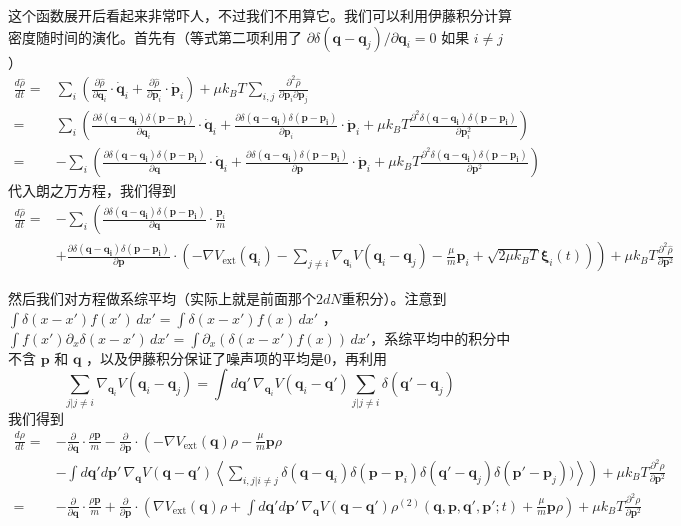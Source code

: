 \documentclass{ctexart}
\newcommand\non{\nonumber \\}
\begin{document}
这个函数展开后看起来非常吓人，不过我们不用算它。我们可以利用伊藤积分计算密度随时间的演化。首先有（等式第二项利用了 $\partial\delta(\bm{q}-\bm{q}_j)/\partial\bm{q}_i=0$ 如果 $i\neq j$ ）
\begin{align} 
\frac{d\hat{\rho}}{dt}=&\sum_i\left(\frac{\partial\hat\rho}{\partial\bm{q}_i}\cdot\dot{\bm{q}}_i+\frac{\partial\hat\rho}{\partial\bm{p}_i}\cdot\dot{\bm{p}}_i\right)+\mu k_BT\sum_{i,j}\frac{\partial^2\hat{\rho}}{\partial\bm{p}_i\partial\bm{p}_j} \non
 =&\sum_i\left(\frac{\partial\delta(\bm{q}-\bm{q_i})\delta(\bm{p}-\bm{p_i})}{\partial\bm{q}_i}\cdot\dot{\bm{q}}_i+\frac{\partial\delta(\bm{q}-\bm{q_i})\delta(\bm{p}-\bm{p_i})}{\partial\bm{p}_i}\cdot\dot{\bm{p}}_i+\mu k_BT\frac{\partial^2\delta(\bm{q}-\bm{q_i})\delta(\bm{p}-\bm{p_i})}{\partial\bm{p}_i^2}\right) \non
 =&-\sum_i\left(\frac{\partial\delta(\bm{q}-\bm{q_i})\delta(\bm{p}-\bm{p_i})}{\partial\bm{q}}\cdot\dot{\bm{q}}_i+\frac{\partial\delta(\bm{q}-\bm{q_i})\delta(\bm{p}-\bm{p_i})}{\partial\bm{p}}\cdot\dot{\bm{p}}_i+\mu k_BT\frac{\partial^2\delta(\bm{q}-\bm{q_i})\delta(\bm{p}-\bm{p_i})}{\partial\bm{p}^2}\right)
\end{align}
代入朗之万方程，我们得到 
\begin{align} 
\frac{d\hat{\rho}}{dt}=&-\sum_i\left(\frac{\partial\delta(\bm{q}-\bm{q_i})\delta(\bm{p}-\bm{p_i})}{\partial\bm{q}}\cdot\frac{\bm{p}_i}{m}\right. \non
&\left.+\frac{\partial\delta(\bm{q}-\bm{q_i})\delta(\bm{p}-\bm{p_i})}{\partial\bm{p}}\cdot\left(-\nabla V_{\mathrm{ext}}(\bm{q}_i)-\sum_{j\neq i}\nabla_{\bm{q}_i} V(\bm{q}_i-\bm{q}_j)-\frac{\mu}{m}\bm{p}_i+\sqrt{2\mu k_BT}\bm{\xi}_i(t)\right)\right)+\mu k_BT\frac{\partial^2\hat{\rho}}{\partial\bm{p}^2} 
\end{align}

然后我们对方程做系综平均（实际上就是前面那个$2dN$重积分）。注意到$\int \delta(x-x')f(x')\,dx'=\int \delta(x-x')f(x)\,dx'$ ，$\int f(x')\partial_x\delta(x-x')\,dx'=\int \partial_x(\delta(x-x')f(x))\,dx'$，系综平均中的积分中不含 $\bm{p}$ 和 $\bm{q}$ ，以及伊藤积分保证了噪声项的平均是0，再利用
\begin{equation}
\sum_{j|j\neq i}\nabla_{\bm{q}_i}V(\bm{q}_i-\bm{q}_j)=\int d\bm{q}'\, \nabla_{\bm{q}_i}V(\bm{q}_i-\bm{q}')\sum_{j|j\neq i}\delta(\bm{q}'-\bm{q}_j)
\end{equation}
我们得到
\begin{align} 
\frac{d\rho}{dt}=&-\frac{\partial}{\partial\bm{q}}\cdot\frac{\rho\bm{p}}{m}-\frac{\partial}{\partial\bm{p}}\cdot\left(-\nabla V_{\mathrm{ext}}(\bm{q})\rho-\frac{\mu}{m}\bm{p}\rho\right. \non 
&\left.-\int d\bm{q}'d\bm{p}'\,\nabla_{\bm{q}} V(\bm{q}-\bm{q}')\left\langle\sum_{i,j|i\neq j}\delta(\bm{q}-\bm{q}_i)\delta(\bm{p}-\bm{p}_i)\delta(\bm{q}'-\bm{q}_j)\delta(\bm{p}'-\bm{p}_j))\right\rangle\right)+\mu k_BT\frac{\partial^2\rho}{\partial\bm{p}^2} \non
 =&-\frac{\partial}{\partial\bm{q}}\cdot\frac{\rho\bm{p}}{m}+\frac{\partial}{\partial\bm{p}}\cdot\left(\nabla V_{\mathrm{ext}}(\bm{q})\rho+\int d\bm{q}'d\bm{p}'\,\nabla_{\bm{q}} V(\bm{q}-\bm{q}')\rho^{(2)}(\bm{q},\bm{p},\bm{q'},\bm{p'};t)+\frac{\mu}{m}\bm{p}\rho\right)+\mu k_BT\frac{\partial^2\rho}{\partial\bm{p}^2} 
\end{align}
\end{document}
